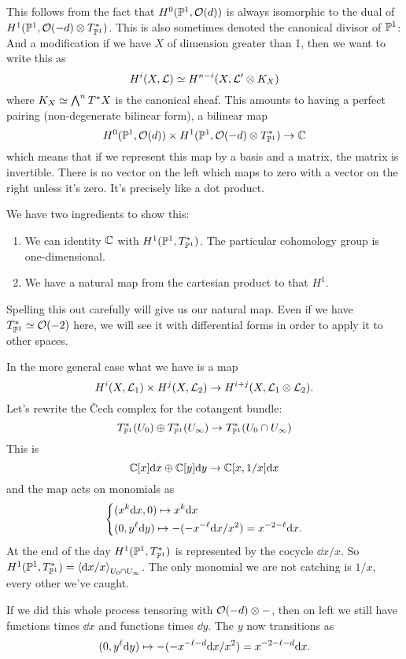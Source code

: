 \documentclass[12pt]{memoir}
\begin{document}
This follows from the fact that $H^0(\mathbb{P}^1,\mathcal{O}(d))$ is always isomorphic to the dual of $H^1(\mathbb{P}^1,\mathcal{O}(-d)\otimes T^\ast_{\mathbb{P}^1})$. This is also sometimes denoted the canonical divisor of $\mathbb{P}^1$: 
And a modification if we have $X$ of dimension greater than 1, then we want to write this as
$$H^i(X,\mathcal{L})\simeq H^{n-i}(X,\mathcal{L}'\otimes K_X)$$
where $K_X\simeq\bigwedge^nT^\ast X$ is the canonical sheaf. This amounts to having a perfect pairing (non-degenerate bilinear form), a bilinear map 
$$H^0(\mathbb{P}^1,\mathcal{O}(d))\times H^1(\mathbb{P}^1,\mathcal{O}(-d)\otimes T^\ast_{\mathbb{P}^1})\to\mathbb{C}$$
which means that if we represent this map by a basis and a matrix, the matrix is invertible. There is no vector on the left which maps to zero with a vector on the right unless it's zero. It's precisely like a dot product.\par
We have two ingredients to show this:
\begin{enumerate}
    \item We can identity $\mathbb{C}$ with $H^1(\mathbb{P}^1,T^\ast_{\mathbb{P}^1})$. The particular cohomology group is one-dimensional.
    \item We have a natural map from the cartesian product to that $H^1$.
\end{enumerate}
Spelling this out carefully will give us our natural map. Even if we have $T^\ast_{\mathbb{P}^1}\simeq\mathcal{O}(-2)$ here, we will see it with differential forms in order to apply it to other spaces.\par
In the more general case what we have is a map 
$$H^i(X,\mathcal{L}_1)\times H^j(X,\mathcal{L}_2)\to H^{i+j}(X,\mathcal{L}_1\otimes\mathcal{L}_2).$$
Let's rewrite the \v{C}ech complex for the cotangent bundle:
$$T^\ast_{\mathbb{P}^1}(U_0)\oplus T^\ast_{\mathbb{P}^1}(U_\infty)\to T^\ast_{\mathbb{P}^1}(U_0\cap U_\infty)$$
This is 
$$\mathbb{C}[x]\dd x\oplus \mathbb{C}[y]\dd y\to\mathbb{C}[x,1/x]\dd x$$
and the map acts on monomials as 
$$
\left\lbrace
\begin{aligned}
    &(x^k\dd x,0)\mapsto x^k\dd x\\
    &(0,y^\ell\dd y)\mapsto -(-x^{-\ell}\dd x/x^2)=x^{-2-\ell}\dd x.
\end{aligned}
\right.
$$
At the end of the day $H^1(\mathbb{P}^1,T^\ast_{\mathbb{P}^1})$ is represented by the cocycle $\dd x/x$. So $H^1(\mathbb{P}^1,T^\ast_{\mathbb{P}^1})=\left\langle \dd x/x\right\rangle_{U_0\cap U_\infty}$. The only monomial we are not catching is $1/x$, every other we've caught.\par
If we did this whole process tensoring with $\mathcal{O}(-d)\otimes-$, then on left we still have functions times $\dd x$ and functions times $\dd y$. The $y$ now transitions as 
$$(0,y^\ell\dd y)\mapsto -(-x^{-\ell-d}\dd x/x^2)=x^{-2-\ell-d}\dd x.$$
\end{document}
